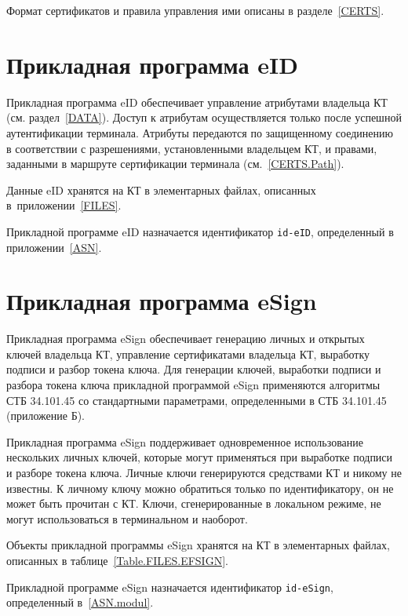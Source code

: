 
Формат сертификатов и правила управления ими описаны в разделе~\ref{CERTS}.

\section{Прикладная программа eID}\label{OBJ.eID}

Прикладная программа eID обеспечивает управление атрибутами владельца КТ 
(см. раздел~\ref{DATA}). Доступ к атрибутам 
осуществляется только после успешной аутентификации терминала. Атрибуты 
передаются по защищенному соединению в соответствии с разрешениями, 
установленными владельцем КТ, и правами, заданными в маршруте сертификации 
терминала (см.~\ref{CERTS.Path}).  

Данные eID хранятся на КТ в элементарных файлах, описанных в~приложении~\ref{FILES}.


Прикладной программе eID назначается идентификатор \verb|id-eID|, 
определенный в приложении~\ref{ASN}. 

\section{Прикладная программа eSign}\label{OBJ.eSign}

Прикладная программа eSign обеспечивает генерацию личных и открытых 
ключей владельца КТ, управление сертификатами владельца КТ, 
выработку подписи и разбор токена ключа.
Для генерации ключей, выработки подписи и разбора токена ключа
прикладной программой eSign
применяются алгоритмы СТБ 34.101.45 со стандартными параметрами,
определенными в СТБ 34.101.45 (приложение Б).


Прикладная программа eSign поддерживает одновременное 
использование нескольких личных ключей, 
которые могут применяться при выработке подписи и разборе токена ключа.
Личные ключи генерируются средствами КТ и никому не известны. 
К личному ключу можно обратиться только по идентификатору, 
он не может быть прочитан с КТ. 
Ключи, сгенерированные в локальном режиме, не могут использоваться 
в терминальном и наоборот.
\fi

Объекты прикладной программы eSign хранятся на 
КТ в элементарных файлах, 
описанных в таблице~\ref{Table.FILES.EFSIGN}.

Прикладной программе eSign назначается идентификатор \verb|id-eSign|, 
определенный в~\ref{ASN.modul}. 


